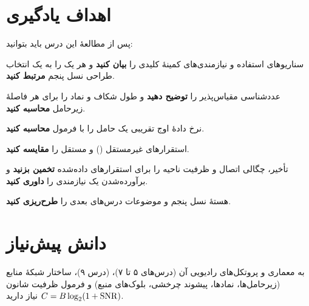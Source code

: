 \documentclass[11pt,a4paper]{article}
\begin{document}
\ACNcover

\section{اهداف یادگیری}
پس از مطالعهٔ این درس باید بتوانید:
\begin{objectives}
  \item سناریوهای استفاده و نیازمندی‌های کمینهٔ کلیدی  را \textbf{بیان کنید} و هر یک را به یک انتخاب طراحی
        نسل پنجم \textbf{مرتبط کنید}.
  \item عددشناسی مقیاس‌پذیر  را \textbf{توضیح دهید} و طول شکاف و نماد را برای هر فاصلهٔ زیرحامل \textbf{محاسبه کنید}.
  \item نرخ دادهٔ اوج تقریبی یک حامل  را با فرمول  \textbf{محاسبه کنید}.
  \item استقرارهای غیرمستقل () و مستقل را \textbf{مقایسه کنید}.
  \item تأخیر، چگالی اتصال و ظرفیت ناحیه را برای استقرارهای داده‌شده \textbf{تخمین بزنید} و برآورده‌شدن یک نیازمندی را
        \textbf{داوری کنید}.
  \item هستهٔ نسل پنجم و موضوعات درس‌های بعدی را \textbf{طرح‌ریزی کنید}.
\end{objectives}

\section{دانش پیش‌نیاز}
به معماری  و پروتکل‌های رادیویی آن (درس‌های ۵ تا ۷)،  (درس ۹)، ساختار شبکهٔ منابع 
(زیرحامل‌ها، نمادها، پیشوند چرخشی، بلوک‌های منبع) و فرمول ظرفیت شانون $C = B\log_2(1+\mathrm{SNR})$
\cite{shannon1948mathematical} نیاز دارید.
\end{document}
